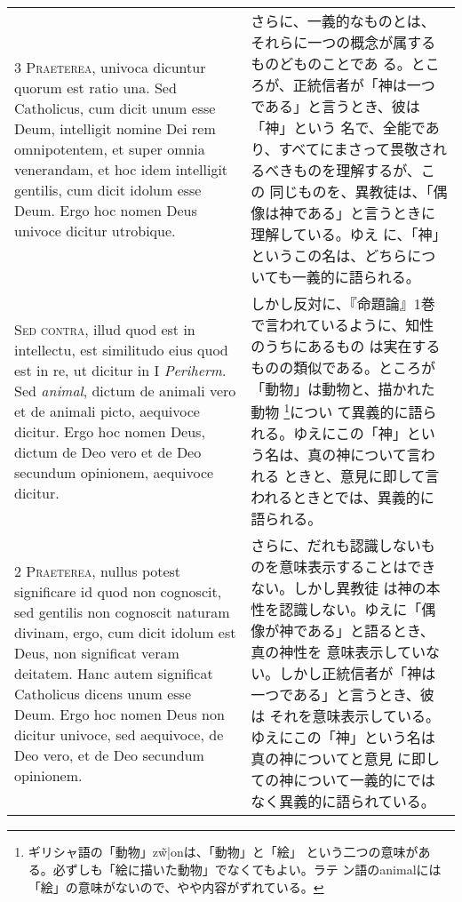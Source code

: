 \documentclass[10pt]{jsarticle}
\begin{document}
\begin{longtable}{p{21em}p{21em}}
\\

{\scshape 3 Praeterea}, univoca dicuntur quorum est ratio una. Sed
Catholicus, cum dicit unum esse Deum, intelligit nomine Dei rem
omnipotentem, et super omnia venerandam, et hoc idem intelligit
gentilis, cum dicit idolum esse Deum. Ergo hoc nomen Deus univoce
dicitur utrobique.

&

さらに、一義的なものとは、それらに一つの概念が属するものどものことであ
る。ところが、正統信者が「神は一つである」と言うとき、彼は「神」という
名で、全能であり、すべてにまさって畏敬されるべきものを理解するが、この
同じものを、異教徒は、「偶像は神である」と言うときに理解している。ゆえ
に、「神」というこの名は、どちらについても一義的に語られる。

\\

{\scshape Sed contra}, illud quod est in intellectu, est similitudo
eius quod est in re, ut dicitur in I {\itshape Periherm}. Sed
{\itshape animal}, dictum de animali vero et de animali picto,
aequivoce dicitur. Ergo hoc nomen Deus, dictum de Deo vero et de Deo
secundum opinionem, aequivoce dicitur.

&

しかし反対に、『命題論』1巻で言われているように、知性のうちにあるもの
は実在するものの類似である。ところが「動物」は動物と、描かれた動物
\footnote{ギリシャ語の「動物」\textgreek{z\~w|on}は、「動物」と「絵」
という二つの意味がある。必ずしも「絵に描いた動物」でなくてもよい。ラテ
ン語のanimalには「絵」の意味がないので、やや内容がずれている。}につい
て異義的に語られる。ゆえにこの「神」という名は、真の神について言われる
ときと、意見に即して言われるときとでは、異義的に語られる。

\\

{\scshape 2 Praeterea}, nullus potest significare id quod non
cognoscit, sed gentilis non cognoscit naturam divinam, ergo, cum dicit
idolum est Deus, non significat veram deitatem. Hanc autem significat
Catholicus dicens unum esse Deum. Ergo hoc nomen Deus non dicitur
univoce, sed aequivoce, de Deo vero, et de Deo secundum opinionem.

&

さらに、だれも認識しないものを意味表示することはできない。しかし異教徒
は神の本性を認識しない。ゆえに「偶像が神である」と語るとき、真の神性を
意味表示していない。しかし正統信者が「神は一つである」と言うとき、彼は
それを意味表示している。ゆえにこの「神」という名は真の神についてと意見
に即しての神について一義的にではなく異義的に語られている。


\end{longtable}
\end{document}
